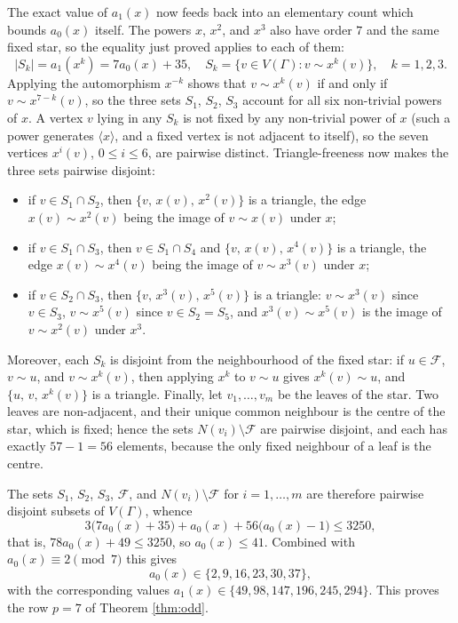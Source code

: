 \documentclass[11pt]{article}
\theoremstyle{plain}
\theoremstyle{remark}
\begin{document}
The exact value of $a_1(x)$ now feeds back into an elementary count which bounds $a_0(x)$ itself.
The powers $x$, $x^2$, and $x^3$ also have order $7$ and the same fixed star, so the equality just proved applies to each of them:
\[
 |S_k|=a_1(x^k)=7a_0(x)+35,
 \quad
 S_k=\{v\in V(\Gamma):v\sim x^k(v)\},
 \quad k=1,2,3.
\]
Applying the automorphism $x^{-k}$ shows that $v\sim x^k(v)$ if and only if $v\sim x^{7-k}(v)$,
so the three sets $S_1$, $S_2$, $S_3$ account for all six non-trivial powers of $x$.
A vertex $v$ lying in any $S_k$ is not fixed by any non-trivial power of $x$ (such a power generates $\langle x\rangle$,
and a fixed vertex is not adjacent to itself), so the seven vertices $x^i(v)$, $0\le i\le 6$, are pairwise distinct.
Triangle-freeness now makes the three sets pairwise disjoint:
\begin{itemize}
\item if $v\in S_1\cap S_2$, then $\{v,\,x(v),\,x^2(v)\}$ is a triangle,
the edge $x(v)\sim x^2(v)$ being the image of $v\sim x(v)$ under $x$;
\item if $v\in S_1\cap S_3$, then $v\in S_1\cap S_4$ and $\{v,\,x(v),\,x^4(v)\}$ is a triangle,
the edge $x(v)\sim x^4(v)$ being the image of $v\sim x^3(v)$ under $x$;
\item if $v\in S_2\cap S_3$, then $\{v,\,x^3(v),\,x^5(v)\}$ is a triangle: $v\sim x^3(v)$ since $v\in S_3$,
$v\sim x^5(v)$ since $v\in S_2=S_5$, and $x^3(v)\sim x^5(v)$ is the image of $v\sim x^2(v)$ under $x^3$.
\end{itemize}
Moreover, each $S_k$ is disjoint from the neighbourhood of the fixed star: if $u\in\mathcal F$, $v\sim u$,
and $v\sim x^k(v)$, then applying $x^k$ to $v\sim u$ gives $x^k(v)\sim u$, and $\{u,\,v,\,x^k(v)\}$ is a triangle.
Finally, let $v_1,\dots,v_m$ be the leaves of the star.
Two leaves are non-adjacent, and their unique common neighbour is the centre of the star, which is fixed;
hence the sets $N(v_i)\setminus\mathcal F$ are pairwise disjoint, and each has exactly $57-1=56$ elements,
because the only fixed neighbour of a leaf is the centre.

The sets $S_1$, $S_2$, $S_3$, $\mathcal F$,
and $N(v_i)\setminus\mathcal F$ for $i=1,\dots,m$ are therefore pairwise disjoint subsets of $V(\Gamma)$, whence
\[
 3\bigl(7a_0(x)+35\bigr)+a_0(x)+56\bigl(a_0(x)-1\bigr)\le 3250,
\]
that is, $78a_0(x)+49\le 3250$, so $a_0(x)\le 41$.  Combined with $a_0(x)\equiv 2\pmod 7$ this gives
\[
 a_0(x)\in\{2,9,16,23,30,37\},
\]
with the corresponding values $a_1(x)\in\{49,98,147,196,245,294\}$.
This proves the row $p=7$ of Theorem \ref{thm:odd}.
\end{document}
